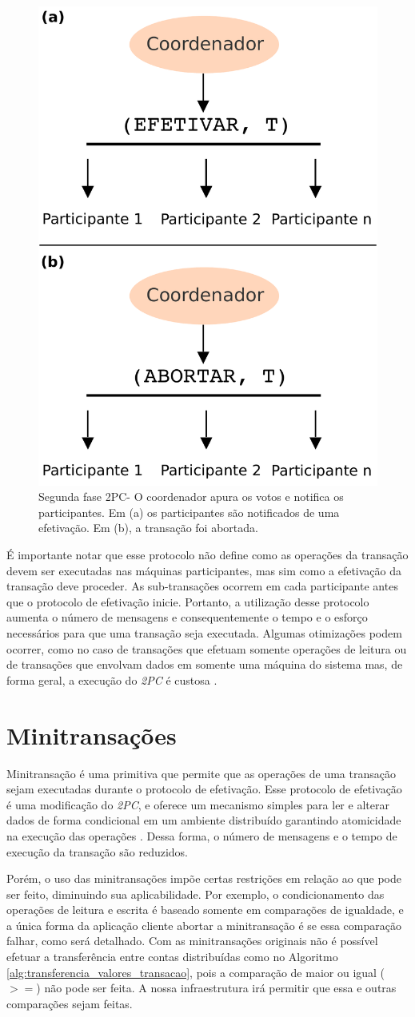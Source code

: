 \documentclass[11pt,twoside,a4paper]{book}
\begin{document}
\begin{figure}
  \centering
  \includegraphics[width=.40\textwidth]{2PC_2fase} 
  \caption{Segunda fase 2PC- O coordenador apura os votos e notifica os participantes. Em (a) os participantes são notificados de uma efetivação. Em (b), a transação foi abortada.}
  \label{fig:2PC_2fase} 
\end{figure}

É importante notar que esse protocolo não define como as operações da transação devem ser executadas nas máquinas participantes, mas sim como a efetivação da transação deve proceder. As sub-transações ocorrem em cada participante antes que o protocolo de efetivação inicie. Portanto, a utilização desse protocolo aumenta o número de mensagens e consequentemente o tempo e o esforço necessários para que uma transação seja executada. Algumas otimizações podem ocorrer, como no caso de transações que efetuam somente operações de leitura ou de transações que envolvam dados em somente uma máquina do sistema mas, de forma geral, a execução do \emph{2PC} é custosa \cite{gray-lamport}.

\section{Minitransações}
\label{sec:minitransacoes}
Minitransação é uma primitiva que permite que as operações de uma transação sejam executadas durante o protocolo de efetivação. Esse protocolo de efetivação é uma modificação do \emph{2PC}, e oferece um mecanismo simples para ler e alterar dados de forma condicional em um ambiente distribuído garantindo atomicidade na execução das operações \cite{sinfonia}. Dessa forma, o número de mensagens e o tempo de execução da transação são reduzidos. 

Porém, o uso das minitransações impõe certas restrições em relação ao que pode ser feito, diminuindo sua aplicabilidade. Por exemplo, o condicionamento das operações de leitura e escrita é baseado somente em comparações de igualdade, e a única forma da aplicação cliente abortar a minitransação é se essa comparação falhar, como será detalhado. Com as minitransações originais não é possível efetuar a transferência entre contas distribuídas como no Algoritmo \ref{alg:transferencia_valores_transacao}, pois a comparação de maior ou igual ($>=$) não pode ser feita. A nossa infraestrutura irá permitir que essa e outras comparações sejam feitas.
\end{document}
